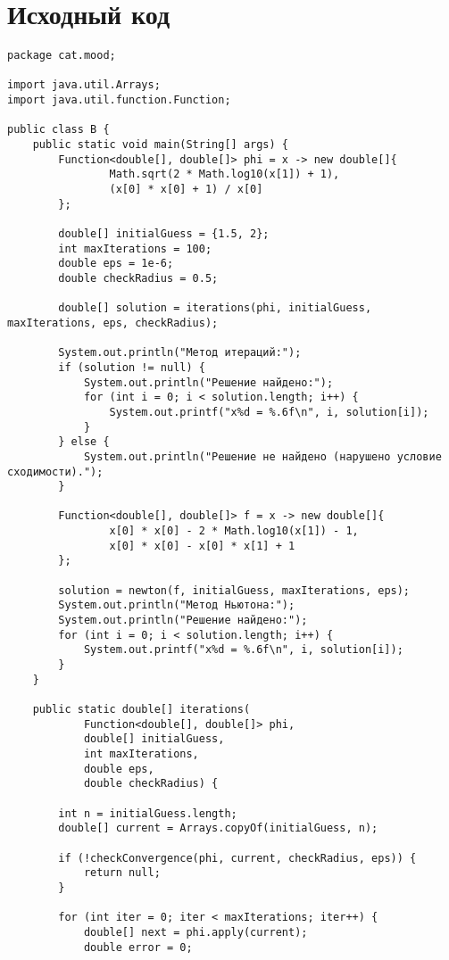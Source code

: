 \section*{Исходный код}

\begin{verbatim}
package cat.mood;

import java.util.Arrays;
import java.util.function.Function;

public class B {
    public static void main(String[] args) {
        Function<double[], double[]> phi = x -> new double[]{
                Math.sqrt(2 * Math.log10(x[1]) + 1),
                (x[0] * x[0] + 1) / x[0]
        };

        double[] initialGuess = {1.5, 2};
        int maxIterations = 100;
        double eps = 1e-6;
        double checkRadius = 0.5;

        double[] solution = iterations(phi, initialGuess, maxIterations, eps, checkRadius);

        System.out.println("Метод итераций:");
        if (solution != null) {
            System.out.println("Решение найдено:");
            for (int i = 0; i < solution.length; i++) {
                System.out.printf("x%d = %.6f\n", i, solution[i]);
            }
        } else {
            System.out.println("Решение не найдено (нарушено условие сходимости).");
        }

        Function<double[], double[]> f = x -> new double[]{
                x[0] * x[0] - 2 * Math.log10(x[1]) - 1,
                x[0] * x[0] - x[0] * x[1] + 1
        };

        solution = newton(f, initialGuess, maxIterations, eps);
        System.out.println("Метод Ньютона:");
        System.out.println("Решение найдено:");
        for (int i = 0; i < solution.length; i++) {
            System.out.printf("x%d = %.6f\n", i, solution[i]);
        }
    }

    public static double[] iterations(
            Function<double[], double[]> phi,
            double[] initialGuess,
            int maxIterations,
            double eps,
            double checkRadius) {

        int n = initialGuess.length;
        double[] current = Arrays.copyOf(initialGuess, n);

        if (!checkConvergence(phi, current, checkRadius, eps)) {
            return null;
        }

        for (int iter = 0; iter < maxIterations; iter++) {
            double[] next = phi.apply(current);
            double error = 0;


\end{verbatim}
